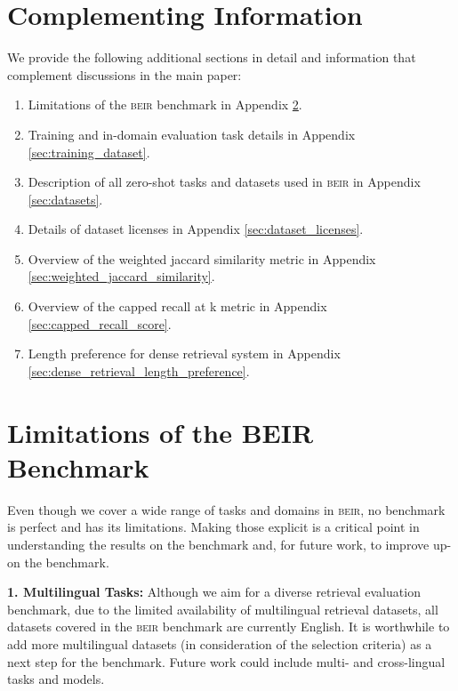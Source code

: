 \documentclass{article}
\newcommand{\custo}[1]{\textsc{\normalsize #1}}
\newcommand{\beir}{\custo{beir}\xspace}
\begin{document}
\appendix

\section{Complementing Information}
We provide the following additional sections in detail and information that complement discussions in the main paper: 

\begin{enumerate}
    \item[] Limitations of the \beir benchmark in Appendix \ref{sec:limitations}.
    \item[] Training and in-domain evaluation task details in Appendix \ref{sec:training_dataset}.
    \item[] Description of all zero-shot tasks and datasets used in \beir in Appendix \ref{sec:datasets}.
    \item[] Details of dataset licenses in Appendix \ref{sec:dataset_licenses}.
    \item[] Overview of the weighted jaccard similarity metric in Appendix \ref{sec:weighted_jaccard_similarity}.
    \item[] Overview of the capped recall at k metric in Appendix \ref{sec:capped_recall_score}.
    \item[] Length preference for dense retrieval system in Appendix \ref{sec:dense_retrieval_length_preference}.
\end{enumerate}

\vspace{-2mm}
\section{Limitations of the BEIR Benchmark}\label{sec:limitations}
\vspace{-2mm}

Even though we cover a wide range of tasks and domains in \beir, no benchmark is perfect and has its limitations. Making those explicit is a critical point in understanding the results on the benchmark and, for future work, to improve up-on the benchmark. 

\textbf{1. Multilingual Tasks:} Although we aim for a diverse retrieval evaluation benchmark, due to the limited availability of multilingual retrieval datasets, all datasets covered in the \beir benchmark are currently English. It is worthwhile to add more multilingual datasets \cite{asai-etal-2021-xor, zhang2021mr} (in consideration of the selection criteria) as a next step for the benchmark. Future work could include multi- and cross-lingual tasks and models.
\end{document}
